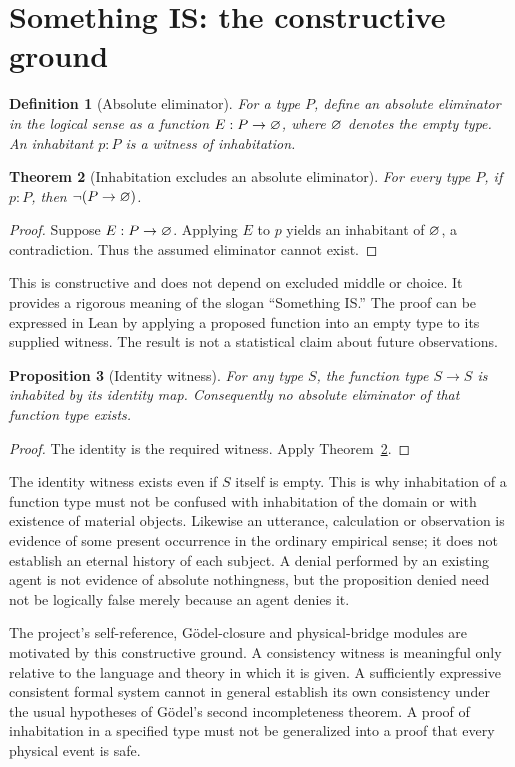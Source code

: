 \documentclass[11pt,a4paper]{article}
\newtheorem{theorem}{Theorem}[section]\newtheorem{proposition}[theorem]{Proposition}\newtheorem{definition}[theorem]{Definition}\newtheorem{example}[theorem]{Example}
\begin{document}
\section{Something IS: the constructive ground}
\begin{definition}[Absolute eliminator]
For a type $P$, define an absolute eliminator in the logical sense as a function $E:P\to\varnothing$, where $\varnothing$ denotes the empty type. An inhabitant $p:P$ is a witness of inhabitation.
\end{definition}
\begin{theorem}[Inhabitation excludes an absolute eliminator]\label{thm:inhabit}
For every type $P$, if $p:P$, then $\neg(P\to\varnothing)$.
\end{theorem}
\begin{proof} Suppose $E:P\to\varnothing$. Applying $E$ to $p$ yields an inhabitant of $\varnothing$, a contradiction. Thus the assumed eliminator cannot exist.\end{proof}
This is constructive and does not depend on excluded middle or choice. It provides a rigorous meaning of the slogan ``Something IS.'' The proof can be expressed in Lean by applying a proposed function into an empty type to its supplied witness. The result is not a statistical claim about future observations.

\begin{proposition}[Identity witness]
For any type $S$, the function type $S\to S$ is inhabited by its identity map. Consequently no absolute eliminator of that function type exists.
\end{proposition}
\begin{proof} The identity is the required witness. Apply Theorem~\ref{thm:inhabit}.\end{proof}
The identity witness exists even if $S$ itself is empty. This is why inhabitation of a function type must not be confused with inhabitation of the domain or with existence of material objects. Likewise an utterance, calculation or observation is evidence of some present occurrence in the ordinary empirical sense; it does not establish an eternal history of each subject. A denial performed by an existing agent is not evidence of absolute nothingness, but the proposition denied need not be logically false merely because an agent denies it.

The project's self-reference, Gödel-closure and physical-bridge modules are motivated by this constructive ground. A consistency witness is meaningful only relative to the language and theory in which it is given. A sufficiently expressive consistent formal system cannot in general establish its own consistency under the usual hypotheses of Gödel's second incompleteness theorem. A proof of inhabitation in a specified type must not be generalized into a proof that every physical event is safe.
\end{document}
